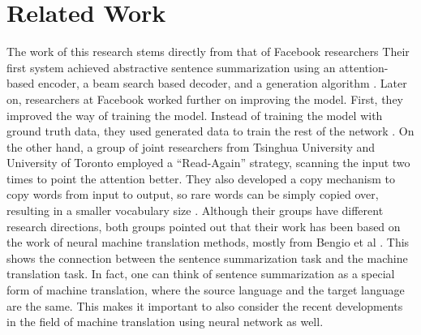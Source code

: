 \documentclass[letterpaper]{article} %
\begin{document}
\section{Related Work}
The work of this research stems directly from that of Facebook researchers Their first system achieved abstractive sentence summarization using an attention-based encoder, a beam search based decoder, and a generation algorithm \cite{rush2015neural}. Later on, researchers at Facebook worked further on improving the model. First, they improved the way of training the model. Instead of training the model with ground truth data, they used generated data to train the rest of the network \cite{ranzato2015sequence}. On the other hand, a group of joint researchers from Tsinghua University and University of Toronto employed a “Read-Again” strategy, scanning the input two times to point the attention better. They also developed a copy mechanism to copy words from input to output, so rare words can be simply copied over, resulting in a smaller vocabulary size \cite{zeng2016efficient}. Although their groups have different research directions, both groups pointed out that their work has been based on the work of neural machine translation methods, mostly from Bengio et al \cite{bahdanau2014neural}. This shows the connection between the sentence summarization task and the machine translation task. In fact, one can think of sentence summarization as a special form of machine translation, where the source language and the target language are the same. This makes it important to also consider the recent developments in the field of machine translation using neural network as well.
\end{document}
